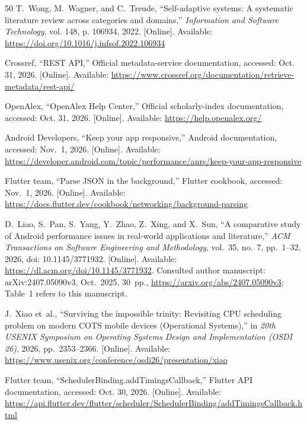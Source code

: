\documentclass[14pt,a4paper,oneside]{extreport}
\begin{document}
\begin{thebibliography}{50}
\BIBentryALTinterwordspacing
T.~Wong, M.~Wagner, and C.~Treude, ``Self-adaptive systems: A systematic
  literature review across categories and domains,'' \emph{Information and
  Software Technology}, vol. 148, p. 106934, 2022. [Online]. Available:
  \url{https://doi.org/10.1016/j.infsof.2022.106934}
\BIBentrySTDinterwordspacing

\BIBentryALTinterwordspacing
{Crossref}, ``{REST API},'' Official metadata-service documentation, accessed:
  Oct. 31, 2026. [Online]. Available:
  \url{https://www.crossref.org/documentation/retrieve-metadata/rest-api/}
\BIBentrySTDinterwordspacing

\BIBentryALTinterwordspacing
{OpenAlex}, ``{OpenAlex Help Center},'' Official scholarly-index documentation,
  accessed: Oct. 31, 2026. [Online]. Available:
  \url{https://help.openalex.org/}
\BIBentrySTDinterwordspacing

Android Developers, ``Keep your app responsive,'' Android documentation,
accessed: Nov.~1, 2026. [Online]. Available:
\url{https://developer.android.com/topic/performance/anrs/keep-your-app-responsive}

Flutter team, ``Parse JSON in the background,'' Flutter cookbook,
accessed: Nov.~1, 2026. [Online]. Available:
\url{https://docs.flutter.dev/cookbook/networking/background-parsing}

D.~Liao, S.~Pan, S.~Yang, Y.~Zhao, Z.~Xing, and X.~Sun, ``A comparative study
of Android performance issues in real-world applications and literature,''
\emph{ACM Transactions on Software Engineering and Methodology}, vol.~35, no.~7,
pp.~1--32, 2026, doi: 10.1145/3771932. [Online]. Available:
\url{https://dl.acm.org/doi/10.1145/3771932}.
Consulted author manuscript: arXiv:2407.05090v3, Oct.~2025, 30~pp.,
\url{https://arxiv.org/abs/2407.05090v3}; Table~1 refers to this manuscript.

J.~Xiao et~al., ``Surviving the impossible trinity: Revisiting CPU scheduling
problem on modern COTS mobile devices (Operational Systems),'' in
\emph{20th USENIX Symposium on Operating Systems Design and Implementation
(OSDI 26)}, 2026, pp.~2353--2366. [Online]. Available:
\url{https://www.usenix.org/conference/osdi26/presentation/xiao}

\BIBentryALTinterwordspacing
{Flutter team}, ``{SchedulerBinding.addTimingsCallback},'' Flutter API
  documentation, accessed: Oct. 30, 2026. [Online]. Available:
  \url{https://api.flutter.dev/flutter/scheduler/SchedulerBinding/addTimingsCallback.html}
\BIBentrySTDinterwordspacing


\end{thebibliography}
\end{document}
